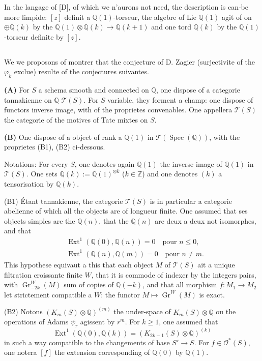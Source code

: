 \documentclass[12pt,a4paper]{article}
\theoremstyle{plain}
\theoremstyle{definition}
\theoremstyle{remark}
\DeclareMathOperator{\Ext}{Ext}
\DeclareMathOperator{\Spec}{Spec}
\newcommand{\Q}{\mathbb{Q}}
\newcommand{\Z}{\mathbb{Z}}
\begin{document}
{In the langage of [D], of which we n'aurons not need, the description is can-be more limpide: $[z]$ d{e}finit a $\Q(1)$-torseur, the alg{e}bre of Lie $\Q(1)$ agit of on $\oplus\Q(k)$ by the $\Q(1)\otimes\Q(k)\to\Q(k+1)$ and one tord $\Q(k)$ by the $\Q(1)$-torseur d{e}finite by $[z]$.

\subsection{}

We we proposons of montrer that the conjecture of D. Zagier (surjectivit{e} of the $\varphi_k$ exclue) r{e}sulte of the conjectures suivantes.

\textbf{(A)} For $S$ a sch{e}ma smooth and connected on $\Q$, one dispose of a cat{e}gorie tannakienne on $\Q$ $\mathcal{T}(S)$. For $S$ variable, they forment a champ: one dispose of functors inverse image, with of the propri{e}t{e}s convenables. One appellera $\mathcal{T}(S)$ the cat{e}gorie of the motives of Tate mixtes on $S$.

\textbf{(B)} One dispose of a object of rank a $\Q(1)$ in $\mathcal{T}(\Spec(\Q))$, with the propri{e}t{e}s (B1), (B2) ci-dessous.

Notations: For every $S$, one denotes again $\Q(1)$ the inverse image of $\Q(1)$ in $\mathcal{T}(S)$. One sets $\Q(k):=\Q(1)^{\otimes k}$ ($k\in\Z$) and one denotes $(k)$ a tensorisation by $\Q(k)$.

(B1) {\'E}tant tannakienne, the cat{e}gorie $\mathcal{T}(S)$ is in particular a cat{e}gorie ab{e}lienne of which all the objects are of longueur finite. One assumed that ses objects simples are the $\Q(n)$, that the $\Q(n)$ are deux {a} deux not isomorphes, and that
\begin{align*}
&\Ext^1(\Q(0),\Q(n))=0 \quad \text{pour }n\leq 0,\\
&\Ext^1(\Q(n),\Q(m))=0 \quad \text{pour }n\neq m.
\end{align*}
This hypoth{e}se {e}quivaut {a} this that each object $M$ of $\mathcal{T}(S)$ ait a unique filtration croissante finite $W$, that it is commode of indexer by the integers pairs, with $\operatorname{Gr}^W_{-2k}(M)$ sum of copies of $\Q(-k)$, and that all morphism $f:M_1\to M_2$ let strictement compatible {a} $W$: the functor $M\mapsto\operatorname{Gr}^W(M)$ is exact.

(B2) Notons $(K_m(S)\otimes\Q)^{(m)}$ the under-space of $K_m(S)\otimes\Q$ o{u} the op{e}rations of Adams $\psi_r$ agissent by $r^m$. For $k\geq 1$, one assumed that
\begin{equation*}
\Ext^1(\Q(0),\Q(k)) = (K_{2k-1}(S)\otimes\Q)^{(k)}
\end{equation*}
in such a way compatible to the changements of base $S'\to S$. For $f\in\mathcal{O}^*(S)$, one notera $[f]$ the extension corresponding of $\Q(0)$ by $\Q(1)$.

}
\end{document}
